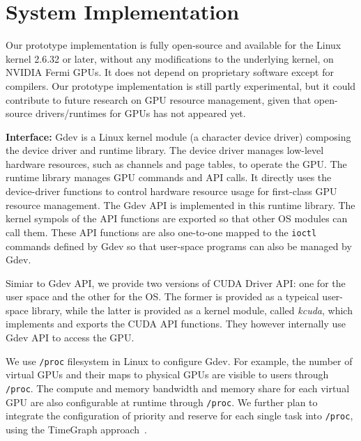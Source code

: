\section{System Implementation}
\label{sec:implementation}

Our prototype implementation is fully open-source and available for the
Linux kernel 2.6.32 or later, without any modifications to the
underlying kernel, on NVIDIA Fermi GPUs.
It does not depend on proprietary software except for compilers.
Our prototype implementation is still partly experimental, but it could
contribute to future research on GPU resource management, given that
open-source drivers/runtimes for GPUs has not appeared yet.

\textbf{Interface:}
Gdev is a Linux kernel module (a character device driver) composing the
device driver and runtime library.
The device driver manages low-level hardware resources, such as channels
and page tables, to operate the GPU.
The runtime library manages GPU commands and API calls.
It directly uses the device-driver functions to control hardware
resource usage for first-class GPU resource management.
The Gdev API is implemented in this runtime library.
The kernel sympols of the API functions are exported so that other OS
modules can call them.
These API functions are also one-to-one mapped to the \texttt{ioctl}
commands defined by Gdev so that user-space programs can also be managed
by Gdev.

Simiar to Gdev API, we provide two versions of CUDA Driver API: one for
the user space and the other for the OS.
The former is provided as a typeical user-space library, while the
latter is provided as a kernel module, called \textit{kcuda},
which implements and exports the CUDA API functions.
They however internally use Gdev API to access the GPU.

We use \texttt{/proc} filesystem in Linux to configure Gdev.
For example, the number of virtual GPUs and their maps to physical GPUs
are visible to users through \texttt{/proc}.
The compute and memory bandwidth and memory share for each virtual GPU
are also configurable at runtime through \texttt{/proc}.
We further plan to integrate the configuration of priority and
reserve for each single task into \texttt{/proc}, using the TimeGraph
approach~\cite{Kato_ATC11}.

